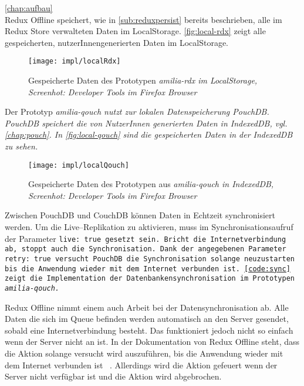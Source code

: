 %
%
\autoref{chap:aufbau}\\
Redux Offline speichert, wie in \autoref{sub:reduxpersist} bereits beschrieben, alle im Redux Store verwalteten Daten im LocalStorage. \autoref{fig:local-rdx} zeigt alle gespeicherten, nutzerInnengenerierten Daten im LocalStorage.
%
\begin{figure}[H]
  \centering
  \texttt{[image: impl/localRdx]}
  \grayRule
  \caption[Gespeicherte Daten im LocalStorage]{Gespeicherte Daten des Prototypen \it{amilia-rdx} im LocalStorage,\\Screenhot: Developer Tools im Firefox Browser}
  \label{fig:local-rdx}
\end{figure}
% 
Der Prototyp \it{amilia-qouch} nutzt zur lokalen Datenspeicherung PouchDB. PouchDB speichert die von NutzerInnen generierten Daten in IndexedDB, vgl. \autoref{chap:pouch}. In \autoref{fig:local-qouch} sind die gespeicherten Daten in der IndexedDB zu sehen.
%
\begin{figure}[H]
  \centering
  \texttt{[image: impl/localQouch]}
  \grayRule
  \caption[Gespeicherte Daten in IndexedDB]{Gespeicherte Daten des Prototypen aus \it{amilia-qouch} in IndexedDB,\\Screenhot: Developer Tools im Firefox Browser}
  \label{fig:local-qouch}
\end{figure}
%
%
Zwischen PouchDB und CouchDB können Daten in Echtzeit synchronisiert werden. Um die Live--Replikation zu aktivieren, muss im Synchronisationsaufruf der Parameter \tt{live: true} gesetzt sein.
Bricht die Internetverbindung ab, stoppt auch die Synchronisation.
Dank der angegebenen Parameter \tt{retry: true} versucht PouchDB die Synchronisation solange neuzustarten bis die Anwendung wieder mit dem Internet verbunden ist. \autoref{code:sync} zeigt die Implementation der Datenbankensynchronisation im Prototypen \it{amilia-qouch}.
%
\begin{center}
  
\end{center}
Redux Offline nimmt einem auch Arbeit bei der Datensynchronisation ab. Alle Daten die sich im Queue befinden werden automatisch an den Server gesendet, sobald eine Internetverbindung besteht. Das funktioniert jedoch nicht so einfach wenn der Server nicht an ist. In der Dokumentation von Redux Offline steht, dass die Aktion solange versucht wird auszuführen, bis die Anwendung wieder mit dem Internet verbunden ist ~\cite{giving-up}. Allerdings wird die  Aktion gefeuert wenn der Server nicht verfügbar ist und die Aktion wird abgebrochen.
